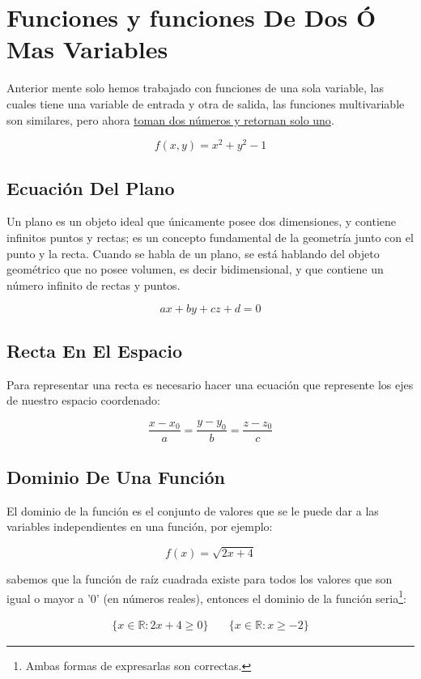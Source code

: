 \documentclass{article}
\begin{document}
\section{Funciones y funciones De Dos Ó Mas Variables}
\label{sec:org2f441ff}
Anterior mente solo hemos trabajado con funciones de una sola variable, las cuales tiene una variable de entrada y otra de salida, las funciones multivariable son similares, pero ahora \uline{toman dos números y retornan solo uno}. 

\[
f(x,y) = x^2 + y^2 - 1
\]

\subsection{Ecuación Del Plano}
\label{sec:orgc12e69b}
Un plano es un objeto ideal que únicamente posee dos dimensiones, y contiene infinitos puntos y rectas; es un concepto fundamental de la geometría junto con el punto y la recta. Cuando se habla de un plano, se está hablando del objeto geométrico que no posee volumen, es decir bidimensional, y que contiene un número infinito de rectas y puntos. 

\[ax+by+cz+d=0\]

\subsection{Recta En El Espacio}
\label{sec:org0a826f9}
Para representar una recta es necesario hacer una ecuación que represente los ejes de nuestro espacio coordenado:

\[
\frac{x-x_0}{a} = \frac{y-y_0}{b} = \frac{z-z_0}{c}
\]

\subsection{Dominio De Una Función}
\label{sec:org70a1dcd}
El dominio de la función es el conjunto de valores que se le puede dar a las variables independientes en una función, por ejemplo:

\[
f(x) = \sqrt{2x+4}
\]

sabemos que la función de raíz cuadrada existe para todos los valores que son igual o mayor a '0' (en números reales), entonces el dominio de la función seria\footnote{Ambas formas de expresarlas son correctas.}:

\[ \begin{aligned}
\{x\in\mathbb{R}:2x+4 \geq 0\} &~& \{x\in\mathbb{R}:x \geq -2\}
\end{aligned} \]
\end{document}
